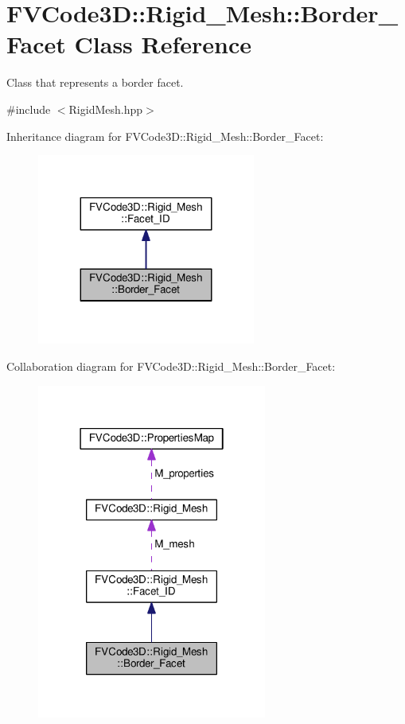 \hypertarget{classFVCode3D_1_1Rigid__Mesh_1_1Border__Facet}{}\section{F\+V\+Code3D\+:\+:Rigid\+\_\+\+Mesh\+:\+:Border\+\_\+\+Facet Class Reference}
\label{classFVCode3D_1_1Rigid__Mesh_1_1Border__Facet}


Class that represents a border facet.  




{\ttfamily \#include $<$Rigid\+Mesh.\+hpp$>$}



Inheritance diagram for F\+V\+Code3D\+:\+:Rigid\+\_\+\+Mesh\+:\+:Border\+\_\+\+Facet\+:
\nopagebreak
\begin{figure}[H]
\begin{center}
\leavevmode
\includegraphics[width=203pt]{classFVCode3D_1_1Rigid__Mesh_1_1Border__Facet__inherit__graph}
\end{center}
\end{figure}


Collaboration diagram for F\+V\+Code3D\+:\+:Rigid\+\_\+\+Mesh\+:\+:Border\+\_\+\+Facet\+:
\nopagebreak
\begin{figure}[H]
\begin{center}
\leavevmode
\includegraphics[width=214pt]{classFVCode3D_1_1Rigid__Mesh_1_1Border__Facet__coll__graph}
\end{center}
\end{figure}
